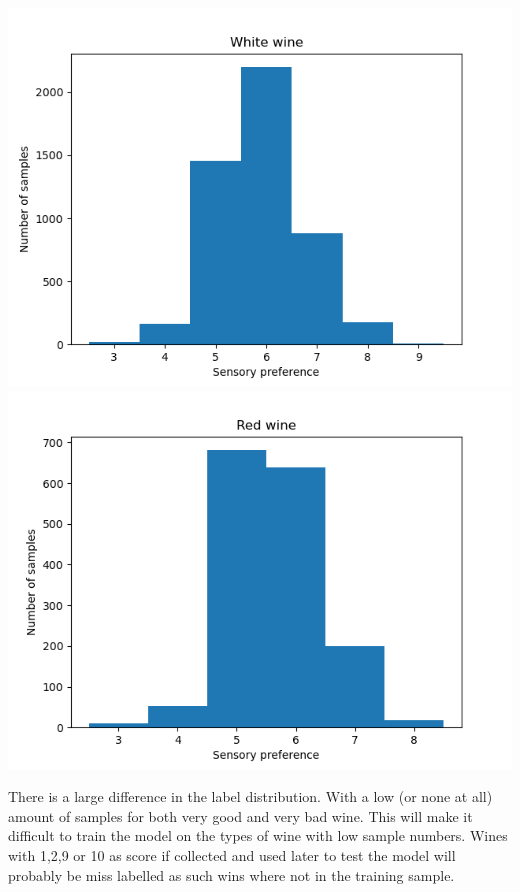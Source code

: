 \documentclass[12pt, letterpaper, twoside]{article}
\begin{document}
\begin{multicols}{2}
	\includegraphics[scale=0.6]{"histogram_white"}\\
	\includegraphics[scale=0.6]{"histogram_red"}\\
\end{multicols}
There is a large difference in the label distribution. With a low (or none at all) amount of samples for both very good and very bad wine. This will make it difficult to train the model on the types of wine with low sample numbers. Wines with 1,2,9 or 10 as score if collected and used later to test the model will probably be miss labelled as such wins where not in the training sample.\\
\ \\
\end{document}
